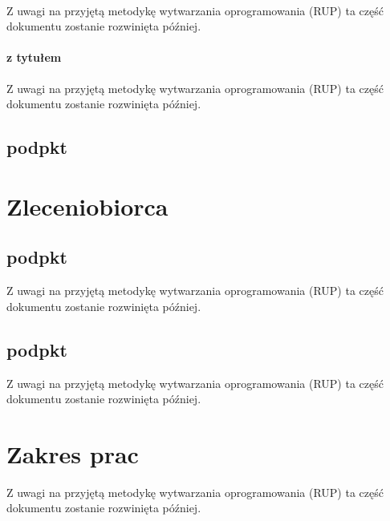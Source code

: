 \documentclass[a4paper,10pt]{article}
\begin{document}
\paragraph{}
Z uwagi na przyjętą metodykę wytwarzania oprogramowania (RUP) ta część dokumentu zostanie rozwinięta później.
\paragraph{z tytułem}
Z uwagi na przyjętą metodykę wytwarzania oprogramowania (RUP) ta część dokumentu zostanie rozwinięta później.
\subsection{podpkt}

\section{Zleceniobiorca}
\subsection{podpkt}
Z uwagi na przyjętą metodykę wytwarzania oprogramowania (RUP) ta część dokumentu zostanie rozwinięta później.
 \cite{historia}

\subsection{podpkt}
Z uwagi na przyjętą metodykę wytwarzania oprogramowania (RUP) ta część dokumentu zostanie rozwinięta później.

\section{Zakres prac}
Z uwagi na przyjętą metodykę wytwarzania oprogramowania (RUP) ta część dokumentu zostanie rozwinięta później.

\clearpage
{}
{}

\end{document}
